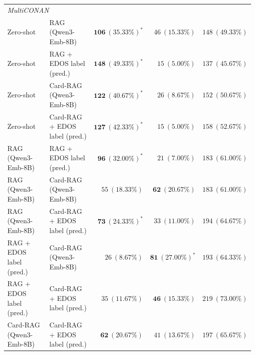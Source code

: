 \begin{table}[t]
{\begin{tabular}{llrrr}
\midrule
\multicolumn{5}{l}{\textit{MultiCONAN}} \\
Zero-shot & RAG (Qwen3-Emb-8B) & $\mathbf{106\ (35.33\%)}^*$ & $46\ (15.33\%)$ & $148\ (49.33\%)$ \\
Zero-shot & RAG + EDOS label (pred.) & $\mathbf{148\ (49.33\%)}^*$ & $15\ (5.00\%)$ & $137\ (45.67\%)$ \\
Zero-shot & Card-RAG (Qwen3-Emb-8B) & $\mathbf{122\ (40.67\%)}^*$ & $26\ (8.67\%)$ & $152\ (50.67\%)$ \\
Zero-shot & Card-RAG + EDOS label (pred.) & $\mathbf{127\ (42.33\%)}^*$ & $15\ (5.00\%)$ & $158\ (52.67\%)$ \\
RAG (Qwen3-Emb-8B) & RAG + EDOS label (pred.) & $\mathbf{96\ (32.00\%)}^*$ & $21\ (7.00\%)$ & $183\ (61.00\%)$ \\
RAG (Qwen3-Emb-8B) & Card-RAG (Qwen3-Emb-8B) & $55\ (18.33\%)$ & $\mathbf{62\ (20.67\%)}$ & $183\ (61.00\%)$ \\
RAG (Qwen3-Emb-8B) & Card-RAG + EDOS label (pred.) & $\mathbf{73\ (24.33\%)}^*$ & $33\ (11.00\%)$ & $194\ (64.67\%)$ \\
RAG + EDOS label (pred.) & Card-RAG (Qwen3-Emb-8B) & $26\ (8.67\%)$ & $\mathbf{81\ (27.00\%)}^*$ & $193\ (64.33\%)$ \\
RAG + EDOS label (pred.) & Card-RAG + EDOS label (pred.) & $35\ (11.67\%)$ & $\mathbf{46\ (15.33\%)}$ & $219\ (73.00\%)$ \\
Card-RAG (Qwen3-Emb-8B) & Card-RAG + EDOS label (pred.) & $\mathbf{62\ (20.67\%)}$ & $41\ (13.67\%)$ & $197\ (65.67\%)$ \\
\bottomrule
\end{tabular}%
}
\end{table}
